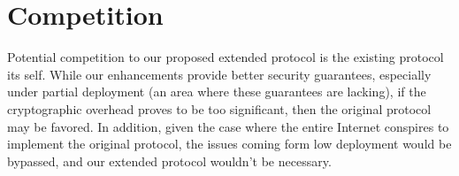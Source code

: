 \documentclass[12pt]{article} %
\begin{document}
\section{Competition} 
	
	Potential competition to our proposed extended protocol is the existing protocol its self. While our enhancements provide better security guarantees, especially under partial deployment (an area where these guarantees are lacking), if the cryptographic overhead proves to be too significant, then the original protocol may be favored. In addition, given the case where the entire Internet conspires to implement the original protocol, the issues coming form low deployment would be bypassed, and our extended protocol wouldn't be necessary.






\end{document}

